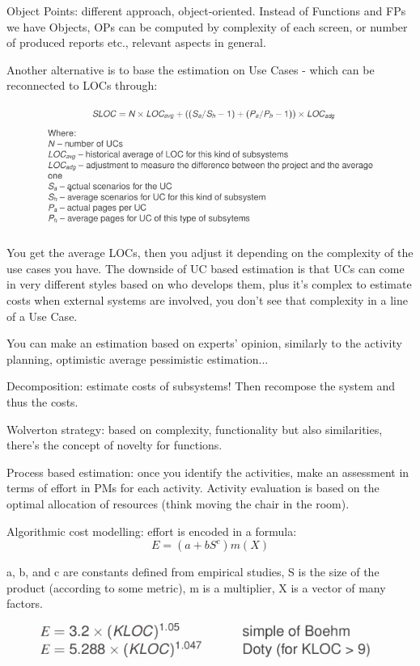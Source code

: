 \noindent Object Points: different approach, object-oriented. Instead of Functions and FPs we have Objects, OPs can be computed by complexity of each screen, or number of produced reports etc., relevant aspects in general.

\noindent Another alternative is to base the estimation on Use Cases - which can be reconnected to LOCs through:

\begin{figure} [H]
    \centering
    \includegraphics[width=0.75\linewidth]{Figures//05/locOP.png}
\end{figure}

\noindent You get the average LOCs, then you adjust it depending on the complexity of the use cases you have. The downside of UC based estimation is that UCs can come in very different styles based on who develops them, plus it's complex to estimate costs when external systems are involved, you don't see that complexity in a line of a Use Case. 

\noindent You can make an estimation based on experts' opinion, similarly to the activity planning, optimistic average pessimistic estimation...

\noindent Decomposition: estimate costs of subsystems! Then recompose the system and thus the costs.

\noindent Wolverton strategy: based on complexity, functionality but also similarities, there's the concept of novelty for functions.

\noindent Process based estimation: once you identify the activities, make an assessment in terms of effort in PMs for each activity. Activity evaluation is based on the optimal allocation of resources (think moving the chair in the room).

\noindent Algorithmic cost modelling: effort is encoded in a formula:
\[E = (a+bS^c)m(X)\]

\noindent a, b, and c are constants defined from empirical studies, S is the size of the product (according to some metric), m is a multiplier, X is a vector of many factors. 

\begin{figure} [H]
    \centering
    \includegraphics[width=0.75\linewidth]{Figures//05/cost1.png}
\end{figure}

